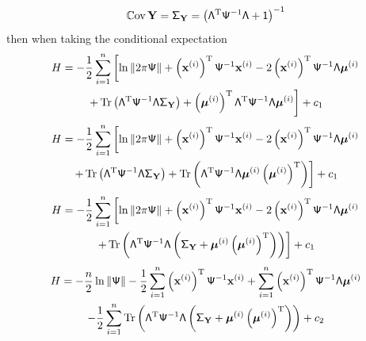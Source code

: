 \documentclass[12pt]{report}
\DeclareMathOperator{\cov}{\mathbb{C}ov}
\DeclareMathOperator{\trace}{Tr}
\newcommand{\T}{^\textup{T}}
\newcommand{\vect}[1]{\mathbf{#1}}
\newcommand{\vectGreek}[1]{\boldsymbol{#1}}
\newcommand{\matr}[1]{\mathsf{#1}}
\begin{document}
\begin{equation}
\cov{\vect{Y}} = \matr{\Sigma}_{\vect{Y}} = \left(\matr{\Lambda}\T\matr{\Psi}^{-1}\matr{\Lambda}+\matr{1}\right)^{-1}
\end{equation}
then when taking the conditional expectation
\begin{multline*}
H = -\frac{1}{2}\sum_{i=1}^{n}\left[
\ln\|2\pi\matr{\Psi}\|+\left(\vect{x}^{(i)}\right)\T\matr{\Psi}^{-1}\vect{x}^{(i)}-2\left(\vect{x}^{(i)}\right)\T\matr{\Psi}^{-1}\matr{\Lambda}\vectGreek{\mu}^{(i)}\right.\\
\left.+\trace\left(\matr{\Lambda}\T\matr{\Psi}^{-1}\matr{\Lambda}\matr{\Sigma}_{\vect{Y}}\right)+\left(\vectGreek{\mu}^{(i)}\right)\T\matr{\Lambda}\T\matr{\Psi}^{-1}\matr{\Lambda}\vectGreek{\mu}^{(i)}
\right]+c_1
\end{multline*}
\begin{multline*}
H = -\frac{1}{2}\sum_{i=1}^{n}\left[
\ln\|2\pi\matr{\Psi}\|+\left(\vect{x}^{(i)}\right)\T\matr{\Psi}^{-1}\vect{x}^{(i)}-2\left(\vect{x}^{(i)}\right)\T\matr{\Psi}^{-1}\matr{\Lambda}\vectGreek{\mu}^{(i)}\right.\\
\left.+\trace\left(\matr{\Lambda}\T\matr{\Psi}^{-1}\matr{\Lambda}\matr{\Sigma}_{\vect{Y}}\right)+\trace\left(\matr{\Lambda}\T\matr{\Psi}^{-1}\matr{\Lambda}\vectGreek{\mu}^{(i)}\left(\vectGreek{\mu}^{(i)}\right)\T\right)
\right]+c_1
\end{multline*}
\begin{multline*}
H = -\frac{1}{2}\sum_{i=1}^{n}\left[
\ln\|2\pi\matr{\Psi}\|+\left(\vect{x}^{(i)}\right)\T\matr{\Psi}^{-1}\vect{x}^{(i)}-2\left(\vect{x}^{(i)}\right)\T\matr{\Psi}^{-1}\matr{\Lambda}\vectGreek{\mu}^{(i)}\right.\\
\left.+\trace\left(\matr{\Lambda}\T\matr{\Psi}^{-1}\matr{\Lambda}\left(\matr{\Sigma}_{\vect{Y}}+\vectGreek{\mu}^{(i)}\left(\vectGreek{\mu}^{(i)}\right)\T\right)\right)
\right]+c_1
\end{multline*}
\begin{multline*}
H = -\frac{n}{2}
\ln\|\matr{\Psi}\|
-\frac{1}{2}\sum_{i=1}^{n}\left(\vect{x}^{(i)}\right)\T\matr{\Psi}^{-1}\vect{x}^{(i)}
+\sum_{i=1}^{n}\left(\vect{x}^{(i)}\right)\T\matr{\Psi}^{-1}\matr{\Lambda}\vectGreek{\mu}^{(i)}\\
-\frac{1}{2}\sum_{i=1}^{n}\trace\left(\matr{\Lambda}\T\matr{\Psi}^{-1}\matr{\Lambda}\left(\matr{\Sigma}_{\vect{Y}}+\vectGreek{\mu}^{(i)}\left(\vectGreek{\mu}^{(i)}\right)\T\right)\right)
+c_2
\end{multline*}
\end{document}
